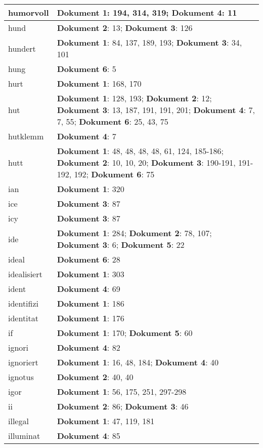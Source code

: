 \documentclass[a5paper]{article}
\begin{document}
\begin{longtable}[l]{|l|p{3in}|}
\hline
humorvoll & \textbf{Dokument 1}: 194, 314, 319; \textbf{Dokument 4}: 11 \\
\hline
hund & \textbf{Dokument 2}: 13; \textbf{Dokument 3}: 126 \\
\hline
hundert & \textbf{Dokument 1}: 84, 137, 189, 193; \textbf{Dokument 3}: 34, 101 \\
\hline
hung & \textbf{Dokument 6}: 5 \\
\hline
hurt & \textbf{Dokument 1}: 168, 170 \\
\hline
hut & \textbf{Dokument 1}: 128, 193; \textbf{Dokument 2}: 12; \textbf{Dokument 3}: 13, 187, 191, 191, 201; \textbf{Dokument 4}: 7, 7, 55; \textbf{Dokument 6}: 25, 43, 75 \\
\hline
hutklemm & \textbf{Dokument 4}: 7 \\
\hline
hutt & \textbf{Dokument 1}: 48, 48, 48, 48, 61, 124, 185-186; \textbf{Dokument 2}: 10, 10, 20; \textbf{Dokument 3}: 190-191, 191-192, 192; \textbf{Dokument 6}: 75 \\
\hline
ian & \textbf{Dokument 1}: 320 \\
\hline
ice & \textbf{Dokument 3}: 87 \\
\hline
icy & \textbf{Dokument 3}: 87 \\
\hline
ide & \textbf{Dokument 1}: 284; \textbf{Dokument 2}: 78, 107; \textbf{Dokument 3}: 6; \textbf{Dokument 5}: 22 \\
\hline
ideal & \textbf{Dokument 6}: 28 \\
\hline
idealisiert & \textbf{Dokument 1}: 303 \\
\hline
ident & \textbf{Dokument 4}: 69 \\
\hline
identifizi & \textbf{Dokument 1}: 186 \\
\hline
identitat & \textbf{Dokument 1}: 176 \\
\hline
if & \textbf{Dokument 1}: 170; \textbf{Dokument 5}: 60 \\
\hline
ignori & \textbf{Dokument 4}: 82 \\
\hline
ignoriert & \textbf{Dokument 1}: 16, 48, 184; \textbf{Dokument 4}: 40 \\
\hline
ignotus & \textbf{Dokument 2}: 40, 40 \\
\hline
igor & \textbf{Dokument 1}: 56, 175, 251, 297-298 \\
\hline
ii & \textbf{Dokument 2}: 86; \textbf{Dokument 3}: 46 \\
\hline
illegal & \textbf{Dokument 1}: 47, 119, 181 \\
\hline
illuminat & \textbf{Dokument 4}: 85 \\

\end{longtable}
\end{document}
